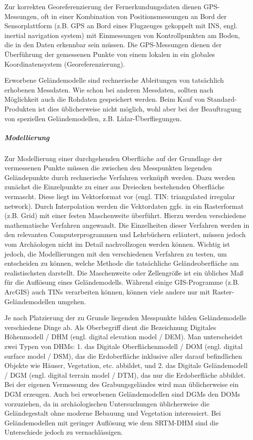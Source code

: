 Zur korrekten Georeferenzierung der Fernerkundungsdaten dienen GPS-Messungen, oft in einer Kombination von Positionsmessungen an Bord der Sensorplattform (z.B. GPS an Bord eines Flugzeuges gekoppelt mit INS, engl. inertial navigation system) mit Einmessungen von Kontrollpunkten am Boden, die in den Daten erkennbar sein müssen. Die GPS-Messungen dienen der Überführung der gemessenen Punkte von einem lokalen in ein globales Koordinatensystem (Georeferenzierung).

Erworbene Geländemodelle sind rechnerische Ableitungen von tatsächlich erhobenen Messdaten. Wie schon bei anderen Messdaten, sollten nach Möglichkeit auch die Rohdaten gespeichert werden. Beim Kauf von Standard-Produkten ist dies üblicherweise nicht möglich, wohl aber bei der Beauftragung von speziellen Geländemodellen, z.B. Lidar-Überfliegungen.

\subparagraph{Modellierung}
Zur Modellierung einer durchgehenden Oberfläche auf der Grundlage der vermessenen Punkte müssen die zwischen den Messpunkten liegenden Geländepunkte durch rechnerische Verfahren verknüpft werden. Dazu werden zunächst die Einzelpunkte zu einer aus Dreiecken bestehenden Oberfläche vermascht. Diese liegt im Vektorformat vor (engl. TIN: triangulated irregular network). Durch Interpolation werden die Vektordaten ggfs. in ein Rasterformat (z.B. Grid) mit einer festen Maschenweite überführt. Hierzu werden verschiedene mathematische Verfahren angewandt. Die Einzelheiten dieser Verfahren werden in den relevanten Computerprogrammen und Lehrbüchern erläutert, müssen jedoch vom Archäologen nicht im Detail nachvollzogen werden können. Wichtig ist jedoch, die Modellierungen mit den verschiedenen Verfahren zu testen, um entscheiden zu können, welche Methode die tatsächliche Geländeoberfläche am realistischsten darstellt. Die Maschenweite oder Zellengröße ist ein übliches Maß für die Auflösung eines Geländemodells. Während einige GIS-Programme (z.B. ArcGIS) auch TINs verarbeiten können, können viele andere nur mit Raster-Geländemodellen umgehen.

Je nach Platzierung der zu Grunde liegenden Messpunkte bilden Geländemodelle verschiedene Dinge ab. Als Oberbegriff dient die Bezeichnung Digitales Höhenmodell / DHM (engl. digital elevation model / DEM). Man unterscheidet zwei Typen von DHMs: 1. das Digitale Oberflächenmodell / DOM (engl. digital surface model / DSM), das die Erdoberfläche inklusive aller darauf befindlichen Objekte wie Häuser, Vegetation, etc. abbildet, und 2. das Digitale Geländemodell / DGM (engl. digital terrain model / DTM), das nur die Erdoberfläche abbildet. Bei der eigenen Vermessung des Grabungsgeländes wird man üblicherweise ein DGM erzeugen. Auch bei erworbenen Geländemodellen sind DGMs den DOMs vorzuziehen, da in archäologischen Untersuchungen üblicherweise die Geländegestalt ohne moderne Bebauung und Vegetation interessiert. Bei Geländemodellen mit geringer Auflösung wie dem SRTM-DHM sind die Unterschiede jedoch zu vernachlässigen.



